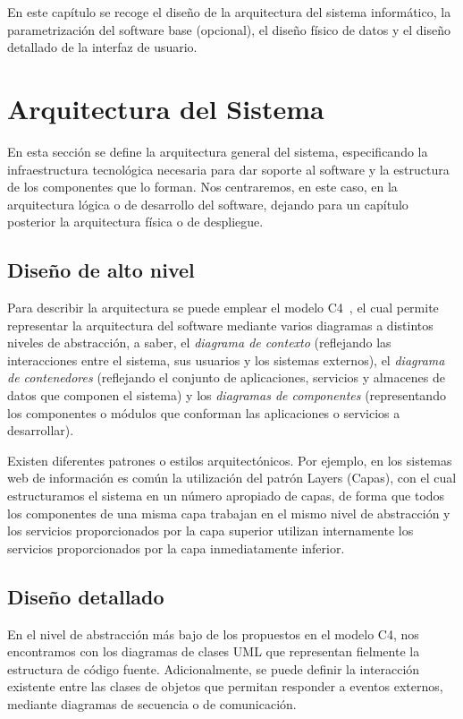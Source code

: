 En este capítulo se recoge el diseño de la arquitectura del sistema informático, la parametrización del software base (opcional), el diseño físico de datos y el diseño detallado de la interfaz de usuario.

\section{Arquitectura del Sistema}
En esta sección se define la arquitectura general del sistema, especificando la infraestructura tecnológica necesaria para dar soporte al software y la estructura de los componentes que lo forman. Nos centraremos, en este caso, en la arquitectura lógica o de desarrollo del software, dejando para un capítulo posterior la arquitectura física o de despliegue. 

\subsection{Diseño de alto nivel}
Para describir la arquitectura se puede emplear el modelo C4~\cite{c4model}, el cual permite representar la arquitectura del software mediante varios diagramas a distintos niveles de abstracción, a saber, el \textit{diagrama de contexto} (reflejando las interacciones entre el sistema, sus usuarios y los sistemas externos), el \textit{diagrama de contenedores} (reflejando el conjunto de aplicaciones, servicios y almacenes de datos que componen el sistema) y los \textit{diagramas de componentes} (representando los componentes o módulos que conforman las aplicaciones o servicios a desarrollar).

Existen diferentes patrones o estilos arquitectónicos. Por ejemplo, en los sistemas web de información es común la utilización del patrón Layers (Capas), con el cual estructuramos el sistema en un número apropiado de capas, de forma que todos los componentes de una misma capa trabajan en el mismo nivel de abstracción y los servicios proporcionados por la capa superior utilizan internamente los servicios proporcionados por la capa inmediatamente inferior. 

\subsection{Diseño detallado}
En el nivel de abstracción más bajo de los propuestos en el modelo C4, nos encontramos con los diagramas de clases UML que representan fielmente la estructura de código fuente. Adicionalmente, se puede definir la interacción existente entre las clases de objetos que permitan responder a eventos externos, mediante diagramas de secuencia o de comunicación.

